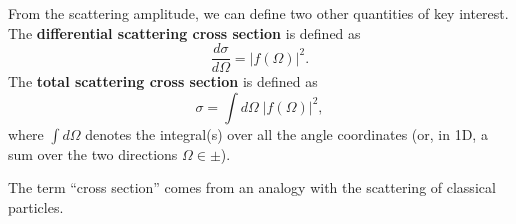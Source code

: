 \documentclass[pra,11pt]{revtex4}
\begin{document}
From the scattering amplitude, we can define two other quantities of
key interest.  The \textbf{differential scattering cross section} is
defined as
$$\frac{d\sigma}{d\Omega} = \big|f(\Omega)\big|^2.$$
The \textbf{total scattering cross section} is defined as
$$\sigma = \int d\Omega\; \big|f(\Omega)\big|^2,$$
where $\int d\Omega$ denotes the integral(s) over all the angle
coordinates (or, in 1D, a sum over the two directions $\Omega \in
\pm$).

The term ``cross section'' comes from an analogy with the scattering
of classical particles.
\end{document}
